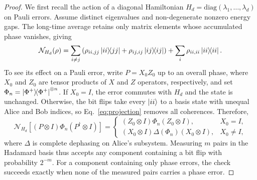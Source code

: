 \documentclass[onecolumn,prx,longbibliography,nofootinbib, superscriptaddress]{revtex4-2}
\theoremstyle{recap}
\begin{document}
\begin{proof}
We first recall the action of a diagonal Hamiltonian $H_d=\mathrm{diag}(\lambda_1,\ldots,\lambda_d)$ on Pauli errors. Assume distinct eigenvalues and non-degenerate nonzero energy gaps. The long-time average retains only matrix elements whose accumulated phase vanishes, giving
\begin{equation}\label{eq:projection}
    \mathcal{N}_{H_d}(\rho)=\sum_{i\neq j}\left(\rho_{ii,jj}\ketbra{ii}{jj}+\rho_{ij,ij}\ketbra{ij}{ij}\right)
    +\sum_i\rho_{ii,ii}\ketbra{ii}{ii}.
\end{equation}
To see its effect on a Pauli error, write $P=X_0Z_0$ up to an overall phase, where $X_0$ and $Z_0$ are tensor products of $X$ and $Z$ operators, respectively, and set $\Phi_n=\ketbra{\Phi^+}{\Phi^+}^{\otimes n}$. If $X_0=I$, the error commutes with $H_d$ and the state is unchanged. Otherwise, the bit flips take every $\ket{ii}$ to a basis state with unequal Alice and Bob indices, so Eq.~\eqref{eq:projection} removes all coherences. Therefore,
\begin{equation}\label{eq:diagonal_error_appendix}
    \mathcal{N}_{H_d}\!\left[(P\otimes I)\Phi_n(P^{\dagger}\otimes I)\right]
    =\begin{cases}
        (Z_0\otimes I)\Phi_n(Z_0\otimes I),&X_0=I,\\
        (X_0\otimes I)\Delta(\Phi_n)(X_0\otimes I),&X_0\neq I,
    \end{cases}
\end{equation}
where $\Delta$ is complete dephasing on Alice's subsystem. Measuring $m$ pairs in the Hadamard basis thus accepts any component containing a bit flip with probability $2^{-m}$. For a component containing only phase errors, the check succeeds exactly when none of the measured pairs carries a phase error.


\end{proof}
\end{document}
